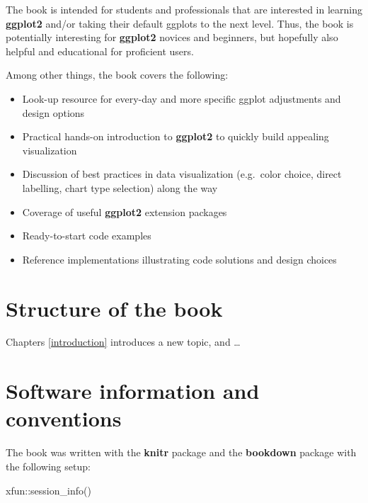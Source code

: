 \documentclass[
]{krantz}
\makeatletter
\newenvironment{Shaded}{\begin{snugshade}}{\end{snugshade}}
\newcommand{\FunctionTok}[1]{\textcolor[rgb]{0,0,0}{#1}}
\newcommand{\NormalTok}[1]{#1}
\newcommand{\SpecialCharTok}[1]{\textcolor[rgb]{0,0,0}{#1}}
\providecommand{\tightlist}{%
  \setlength{\itemsep}{0pt}\setlength{\parskip}{0pt}}
\newenvironment{kframe}{%
\medskip{}
\setlength{\fboxsep}{.8em}
 \def\at@end@of@kframe{}%
 \ifinner\ifhmode%
  \def\at@end@of@kframe{\end{minipage}}%
  \begin{minipage}{\columnwidth}%
 \fi\fi%
 \def\FrameCommand##1{\hskip\@totalleftmargin \hskip-\fboxsep
 \colorbox{shadecolor}{##1}\hskip-\fboxsep
     \hskip-\linewidth \hskip-\@totalleftmargin \hskip\columnwidth}%
 \MakeFramed {\advance\hsize-\width
   \@totalleftmargin\z@ \linewidth\hsize
   \@setminipage}}%
 {\par\unskip\endMakeFramed%
 \at@end@of@kframe}
\renewenvironment{Shaded}{\begin{kframe}}{\end{kframe}}
\makeatother
\begin{document}
The book is intended for students and professionals that are interested in learning \textbf{ggplot2} and/or taking their default ggplots to the next level. Thus, the book is potentially interesting for \textbf{ggplot2} novices and beginners, but hopefully also helpful and educational for proficient users.

Among other things, the book covers the following:

\begin{itemize}
\tightlist
\item
  Look-up resource for every-day and more specific ggplot adjustments and design options
\item
  Practical hands-on introduction to \textbf{ggplot2} to quickly build appealing visualization
\item
  Discussion of best practices in data visualization (e.g.~color choice, direct labelling, chart type selection) along the way
\item
  Coverage of useful \textbf{ggplot2} extension packages
\item
  Ready-to-start code examples
\item
  Reference implementations illustrating code solutions and design choices
\end{itemize}

\hypertarget{structure-of-the-book}{%
\section*{Structure of the book}\label{structure-of-the-book}}


Chapters \ref{introduction} introduces a new topic, and \ldots{}

\hypertarget{software-information-and-conventions}{%
\section*{Software information and conventions}\label{software-information-and-conventions}}


The book was written with the \textbf{knitr} package \citep{xie2015} and the \textbf{bookdown} package \citep{R-bookdown} with the following setup:

\begin{Shaded}
\begin{Highlighting}[]
\NormalTok{xfun}\SpecialCharTok{::}\FunctionTok{session\_info}\NormalTok{()}
\end{Highlighting}
\end{Shaded}
\end{document}
